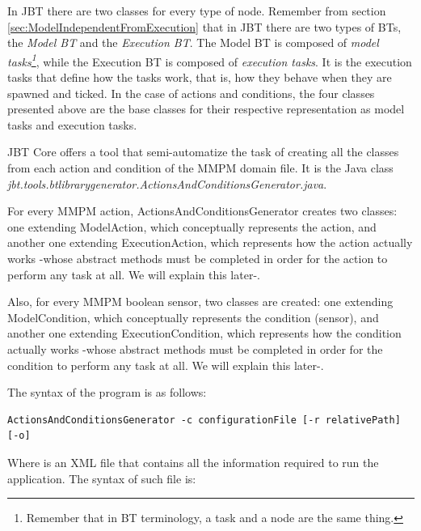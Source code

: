 \documentclass[a4paper]{article}
\begin{document}
In JBT there are two classes for every type of node. Remember from section \ref{sec:ModelIndependentFromExecution} that in JBT there are two types of BTs, the \textit{Model BT} and the \textit{Execution BT}. The Model BT is composed of \textit{model tasks\footnote{Remember that in BT terminology, a task and a node are the same thing.}}, while the Execution BT is composed of \textit{execution tasks}. It is the execution tasks that define how the tasks work, that is, how they behave when they are spawned and ticked. In the case of actions and conditions, the four classes presented above are the base classes for their respective representation as model tasks and execution tasks.

JBT Core offers a tool that semi-automatize the task of creating all the classes from each action and condition of the MMPM domain file. It is the Java class \textit{jbt.tools.btlibrarygenerator.ActionsAndConditionsGenerator.java}.

For every MMPM action, ActionsAndConditionsGenerator creates two classes: one extending ModelAction, which conceptually represents the action, and another one extending ExecutionAction, which represents how the action actually works -whose abstract methods must be completed in order for the action to perform any task at all. We will explain this later-.

Also, for every MMPM boolean sensor, two classes are created: one extending ModelCondition, which conceptually represents the condition (sensor), and another one extending ExecutionCondition, which represents how the condition actually works -whose abstract methods must be completed in order for the condition to perform any task at all. We will explain this later-.

The syntax of the program is as follows:

\begin{verbatim}
ActionsAndConditionsGenerator -c configurationFile [-r relativePath] [-o] 
\end{verbatim}

Where \verb@configurationFile@ is an XML file that contains all the information required to run the application. The syntax of such file is:
\end{document}
